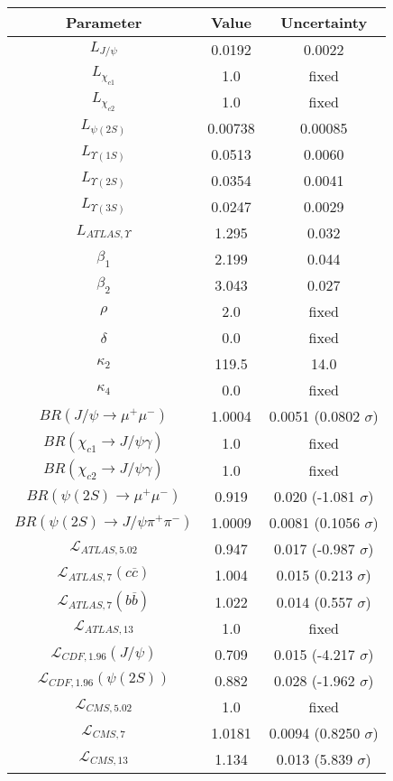\begin{table}[h!]
\centering
\begin{tabular}{c|c|c}
Parameter & Value & Uncertainty \\
\hline
$L_{J/\psi}$ & 0.0192 & 0.0022 \\
$L_{\chi_{c1}}$ & 1.0 & fixed \\
$L_{\chi_{c2}}$ & 1.0 & fixed \\
$L_{\psi(2S)}$ & 0.00738 & 0.00085 \\
$L_{\Upsilon(1S)}$ & 0.0513 & 0.0060 \\
$L_{\Upsilon(2S)}$ & 0.0354 & 0.0041 \\
$L_{\Upsilon(3S)}$ & 0.0247 & 0.0029 \\
$L_{ATLAS,\Upsilon}$ & 1.295 & 0.032 \\
$\beta_1$ & 2.199 & 0.044 \\
$\beta_2$ & 3.043 & 0.027 \\
$\rho$ & 2.0 & fixed \\
$\delta$ & 0.0 & fixed \\
$\kappa_2$ & 119.5 & 14.0 \\
$\kappa_4$ & 0.0 & fixed \\
$BR(J/\psi\rightarrow\mu^+\mu^-)$ & 1.0004 & 0.0051 (0.0802 $\sigma$) \\
$BR(\chi_{c1}\rightarrow J/\psi\gamma)$ & 1.0 & fixed \\
$BR(\chi_{c2}\rightarrow J/\psi\gamma)$ & 1.0 & fixed \\
$BR(\psi(2S)\rightarrow\mu^+\mu^-)$ & 0.919 & 0.020 (-1.081 $\sigma$) \\
$BR(\psi(2S)\rightarrow J/\psi\pi^+\pi^-)$ & 1.0009 & 0.0081 (0.1056 $\sigma$) \\
$\mathcal L_{ATLAS,5.02}$ & 0.947 & 0.017 (-0.987 $\sigma$) \\
$\mathcal L_{ATLAS,7}(c\overline c)$ & 1.004 & 0.015 (0.213 $\sigma$) \\
$\mathcal L_{ATLAS,7}(b\overline b)$ & 1.022 & 0.014 (0.557 $\sigma$) \\
$\mathcal L_{ATLAS,13}$ & 1.0 & fixed \\
$\mathcal L_{CDF,1.96}(J/\psi)$ & 0.709 & 0.015 (-4.217 $\sigma$) \\
$\mathcal L_{CDF,1.96}(\psi(2S))$ & 0.882 & 0.028 (-1.962 $\sigma$) \\
$\mathcal L_{CMS,5.02}$ & 1.0 & fixed \\
$\mathcal L_{CMS,7}$ & 1.0181 & 0.0094 (0.8250 $\sigma$) \\
$\mathcal L_{CMS,13}$ & 1.134 & 0.013 (5.839 $\sigma$) \\

\end{tabular}
\end{table}

